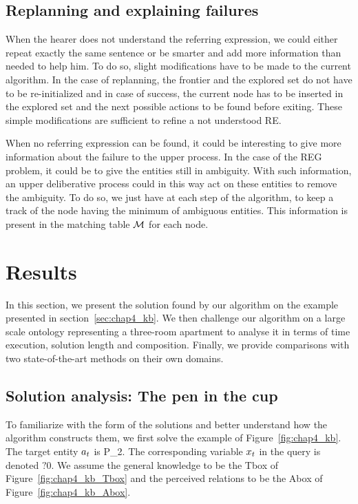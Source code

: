 \subsection{Replanning and explaining failures}

When the hearer does not understand the referring expression, we could either repeat exactly the same sentence or be smarter and add more information than needed to help him. To do so, slight modifications have to be made to the current algorithm. In the case of replanning, the frontier and the explored set do not have to be re-initialized and in case of success, the current node has to be inserted in the explored set and the next possible actions to be found before exiting. These simple modifications are sufficient to refine a not understood RE.

When no referring expression can be found, it could be interesting to give more information about the failure to the upper process. In the case of the REG problem, it could be to give the entities still in ambiguity. With such information, an upper deliberative process could in this way act on these entities to remove the ambiguity. To do so, we just have at each step of the algorithm, to keep a track of the node having the minimum of ambiguous entities. This information is present in the matching table $\mathcal{M}$ for each node.

\section{Results}

In this section, we present the solution found by our algorithm on the example presented in section~\ref{sec:chap4_kb}. We then challenge our algorithm on a large scale ontology representing a three-room apartment to analyse it in terms of time execution, solution length and composition. Finally, we provide comparisons with two state-of-the-art methods on their own domains.

\subsection{Solution analysis: The pen in the cup}

To familiarize with the form of the solutions and better understand how the algorithm constructs them, we first solve the example of Figure~\ref{fig:chap4_kb}. The target entity $a_t$ is P\_2. The corresponding variable $x_t$ in the \sparql{} query is denoted $?0$. We assume the general knowledge to be the Tbox of Figure~\ref{fig:chap4_kb_Tbox} and the perceived relations to be the Abox of Figure~\ref{fig:chap4_kb_Abox}.

